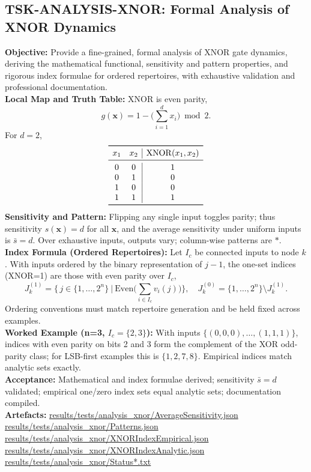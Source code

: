 \documentclass{article}
\begin{document}
\subsection{TSK-ANALYSIS-XNOR: Formal Analysis of XNOR Dynamics}
\textbf{Objective:} Provide a fine-grained, formal analysis of XNOR gate dynamics, deriving the mathematical functional, sensitivity and pattern properties, and rigorous index formulae for ordered repertoires, with exhaustive validation and professional documentation.\\
\textbf{Local Map and Truth Table:} XNOR is even parity,
\[
g(\mathbf{x}) = 1 - \big(\sum_{i=1}^{d} x_i\big)\bmod 2.
\]
For \(d=2\),
\[
\begin{array}{cc|c}
\toprule
 x_1 & x_2 & \mathrm{XNOR}(x_1,x_2) \\
\midrule
 0 & 0 & 1 \\
 0 & 1 & 0 \\
 1 & 0 & 0 \\
 1 & 1 & 1 \\
\bottomrule
\end{array}
\]
\textbf{Sensitivity and Pattern:} Flipping any single input toggles parity; thus sensitivity \(s(\mathbf{x})=d\) for all \(\mathbf{x}\), and the average sensitivity under uniform inputs is \(\bar{s}=d\). Over exhaustive inputs, outputs vary; column-wise patterns are \(*\).\\
\textbf{Index Formula (Ordered Repertoires):} Let \(I_c\) be connected inputs to node \(k\). With inputs ordered by the binary representation of \(j-1\), the one-set indices (XNOR=1) are those with even parity over \(I_c\),
\[
J_k^{(1)} = \big\{\, j \in \{1,\dots,2^n\} \ \big|\ \mathrm{Even}\big(\sum_{i\in I_c} v_i(j)\big) \big\},\quad J_k^{(0)} = \{1,\dots,2^n\} \setminus J_k^{(1)}.
\]
Ordering conventions must match repertoire generation and be held fixed across examples.\\
\textbf{Worked Example (n=3, \(I_c=\{2,3\}\)):} With inputs \(\{(0,0,0),\dots,(1,1,1)\}\), indices with even parity on bits 2 and 3 form the complement of the XOR odd-parity class; for LSB-first examples this is \(\{1,2,7,8\}\). Empirical indices match analytic sets exactly.\\
\textbf{Acceptance:} Mathematical and index formulae derived; sensitivity \(\bar{s}=d\) validated; empirical one/zero index sets equal analytic sets; documentation compiled.\\
\textbf{Artefacts:} \url{results/tests/analysis_xnor/AverageSensitivity.json}\\
\url{results/tests/analysis_xnor/Patterns.json}\\
\url{results/tests/analysis_xnor/XNORIndexEmpirical.json}\\
\url{results/tests/analysis_xnor/XNORIndexAnalytic.json}\\
\url{results/tests/analysis_xnor/Status*.txt}
\end{document}
